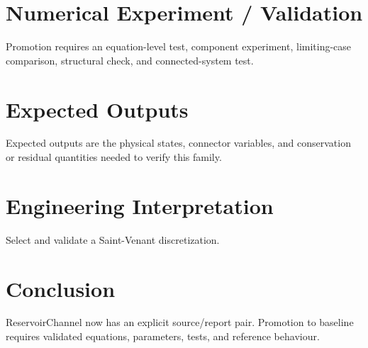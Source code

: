 \documentclass[10pt,a4paper]{article}
\begin{document}
\section{Numerical Experiment / Validation}
Promotion requires an equation-level test, component experiment, limiting-case comparison, structural check, and connected-system test.
\section{Expected Outputs}
Expected outputs are the physical states, connector variables, and conservation or residual quantities needed to verify this family.
\section{Engineering Interpretation}
Select and validate a Saint-Venant discretization.
\section*{Conclusion}
ReservoirChannel now has an explicit source/report pair. Promotion to baseline requires validated equations, parameters, tests, and reference behaviour.
\end{document}

